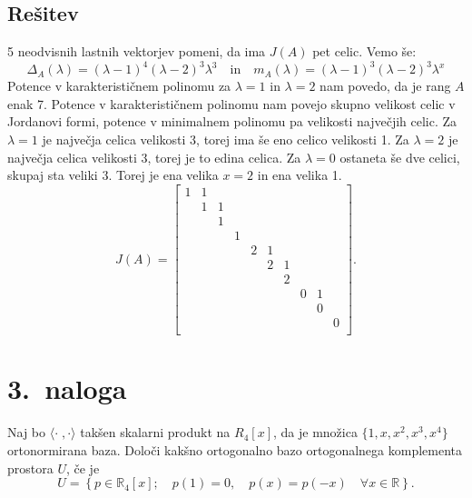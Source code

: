 \documentclass[a4,11pt]{article}
\newcommand{\R}{\mathbb{R}}
\begin{document}
\subsection*{Rešitev}
    5 neodvisnih lastnih vektorjev pomeni, da ima \(J(A)\) pet celic. Vemo še:
    \[
        \Delta_A(\lambda) = {\left(\lambda - 1\right)}^4{\left(\lambda - 2\right)}^3\lambda^3 \quad \text{in} \quad
        m_A(\lambda) = {\left(\lambda - 1\right)}^3{\left(\lambda - 2\right)}^3\lambda^x
    \]
    Potence v karakterističnem polinomu za \(\lambda = 1\) in \(\lambda = 2\) nam povedo, da je rang \(A\) enak 7.
    Potence v karakterističnem polinomu nam povejo skupno velikost celic v Jordanovi formi, potence v minimalnem polinomu pa
    velikosti največjih celic. Za \(\lambda = 1\) je največja celica velikosti 3, torej ima še eno celico velikosti 1.
    Za \(\lambda = 2\) je največja celica velikosti 3, torej je to edina celica. Za \(\lambda = 0\) ostaneta še dve celici,
    skupaj sta veliki 3. Torej je ena velika \(x = 2\) in ena velika 1. 
    \[
        J(A) = \begin{bmatrix}
            1 & 1 &   &   &   &   &   &   &   &   \\
              & 1 & 1 &   &   &   &   &   &   &   \\
              &   & 1 &   &   &   &   &   &   &   \\
              &   &   & 1 &   &   &   &   &   &   \\
              &   &   &   & 2 & 1 &   &   &   &   \\
              &   &   &   &   & 2 & 1 &   &   &   \\
              &   &   &   &   &   & 2 &   &   &   \\
              &   &   &   &   &   &   & 0 & 1 &   \\
              &   &   &   &   &   &   &   & 0 &   \\
              &   &   &   &   &   &   &   &   & 0 \\
        \end{bmatrix}.
    \]

\section*{3.~naloga}
    Naj bo \(\langle \cdot \; , \cdot \rangle\) takšen skalarni produkt na \(R_4\left[x\right]\), da je množica \(\{1, x, x^2, x^3, x^4\}\) ortonormirana baza.
    Določi kakšno ortogonalno bazo ortogonalnega komplementa prostora \(U\), če je
    \[U = \left\{p \in \R_4\left[x\right]; \quad p(1) = 0, \quad p(x) = p(-x) \quad \forall x \in \R\right\}.\]
\end{document}
